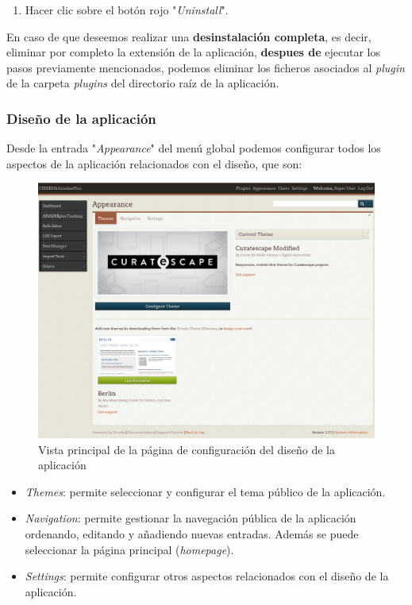 \documentclass[
]{article}
\providecommand{\tightlist}{%
  \setlength{\itemsep}{0pt}\setlength{\parskip}{0pt}}
\begin{document}
\begin{enumerate}
\def\labelenumi{\arabic{enumi}.}
\setcounter{enumi}{4}
\tightlist
\item
  Hacer clic sobre el botón rojo "\emph{Uninstall}".
\end{enumerate}

En caso de que deseemos realizar una \textbf{desinstalación completa},
es decir, eliminar por completo la extensión de la aplicación,
\textbf{despues de} ejecutar los pasos previamente mencionados, podemos
eliminar los ficheros asociados al \emph{plugin} de la carpeta
\emph{plugins} del directorio raíz de la aplicación.

\hypertarget{diseuxf1o-de-la-aplicaciuxf3n}{%
\subsubsection{Diseño de la
aplicación}\label{diseuxf1o-de-la-aplicaciuxf3n}}

Desde la entrada "\emph{Appearance}" del menú global podemos configurar
todos los aspectos de la aplicación relacionados con el diseño, que son:

\begin{figure}
\hypertarget{appearance}{%
\centering
\includegraphics{../_static/images/appearance.png}
\caption{Vista principal de la página de configuración del diseño de la
aplicación}\label{appearance}
}
\end{figure}

\begin{itemize}
\tightlist
\item
  \emph{Themes}: permite seleccionar y configurar el tema público de la
  aplicación.
\item
  \emph{Navigation}: permite gestionar la navegación pública de la
  aplicación ordenando, editando y añadiendo nuevas entradas. Además se
  puede seleccionar la página principal (\emph{homepage}).
\item
  \emph{Settings}: permite configurar otros aspectos relacionados con el
  diseño de la aplicación.
\end{itemize}
\end{document}
